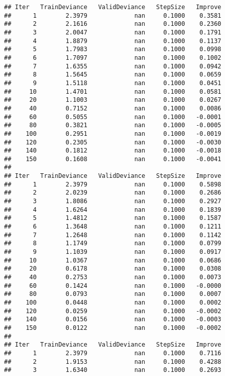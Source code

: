 \documentclass[]{article}
\begin{document}
\begin{verbatim}
## Iter   TrainDeviance   ValidDeviance   StepSize   Improve
##      1        2.3979             nan     0.1000    0.3581
##      2        2.1616             nan     0.1000    0.2360
##      3        2.0047             nan     0.1000    0.1791
##      4        1.8879             nan     0.1000    0.1137
##      5        1.7983             nan     0.1000    0.0998
##      6        1.7097             nan     0.1000    0.1002
##      7        1.6355             nan     0.1000    0.0942
##      8        1.5645             nan     0.1000    0.0659
##      9        1.5118             nan     0.1000    0.0451
##     10        1.4701             nan     0.1000    0.0581
##     20        1.1003             nan     0.1000    0.0267
##     40        0.7152             nan     0.1000    0.0086
##     60        0.5055             nan     0.1000   -0.0001
##     80        0.3821             nan     0.1000   -0.0005
##    100        0.2951             nan     0.1000   -0.0019
##    120        0.2305             nan     0.1000   -0.0030
##    140        0.1812             nan     0.1000   -0.0018
##    150        0.1608             nan     0.1000   -0.0041
## 
## Iter   TrainDeviance   ValidDeviance   StepSize   Improve
##      1        2.3979             nan     0.1000    0.5898
##      2        2.0239             nan     0.1000    0.2686
##      3        1.8086             nan     0.1000    0.2927
##      4        1.6264             nan     0.1000    0.1839
##      5        1.4812             nan     0.1000    0.1587
##      6        1.3648             nan     0.1000    0.1211
##      7        1.2648             nan     0.1000    0.1142
##      8        1.1749             nan     0.1000    0.0799
##      9        1.1039             nan     0.1000    0.0917
##     10        1.0367             nan     0.1000    0.0686
##     20        0.6178             nan     0.1000    0.0308
##     40        0.2753             nan     0.1000    0.0073
##     60        0.1424             nan     0.1000   -0.0000
##     80        0.0793             nan     0.1000    0.0007
##    100        0.0448             nan     0.1000    0.0002
##    120        0.0259             nan     0.1000   -0.0002
##    140        0.0156             nan     0.1000   -0.0003
##    150        0.0122             nan     0.1000   -0.0002
## 
## Iter   TrainDeviance   ValidDeviance   StepSize   Improve
##      1        2.3979             nan     0.1000    0.7116
##      2        1.9153             nan     0.1000    0.4288
##      3        1.6340             nan     0.1000    0.2693

\end{verbatim}
\end{document}
